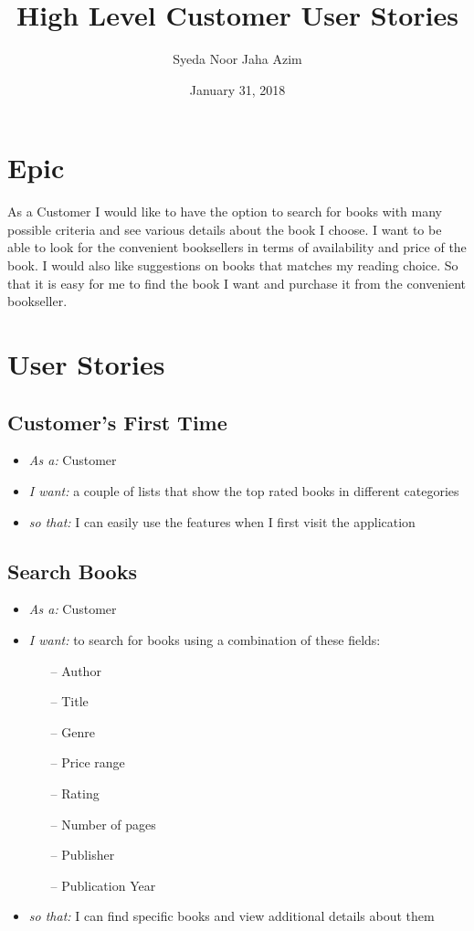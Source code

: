 \documentclass{article}
\title{High Level Customer User Stories}
\author{Syeda Noor Jaha Azim}
\date{January 31, 2018}
\begin{document}
\maketitle

\section{Epic }
As a Customer I would like to have the option to search for books with many possible criteria and see various details about the book I choose. I want to be able to look for the convenient booksellers in terms of availability and price of the book. I would also like suggestions on books that matches my reading choice. So that it is easy for me to find the book I want and purchase it from the convenient bookseller. 

\section{User Stories }

\subsection{Customer's First Time }
\begin{itemize}
\item \emph{As a:} Customer
\item \emph{I want:}  a couple of lists that show the top rated books in different categories
\item \emph{so that:}  I can easily use the features when I first visit the application
\end{itemize}

\subsection{Search Books}
\begin{itemize}
\item \emph{As a:} Customer
\item \emph{I want:} to search for books using a combination of these fields:
\begin{itemize}
    \item[--] Author
    \item[--] Title
    \item[--] Genre
    \item[--] Price range
    \item[--] Rating
    \item[--] Number of pages
    \item[--] Publisher
    \item[--] Publication Year
\end{itemize}
\item \emph{so that:} I can find specific books and view additional details about them
\end{itemize}
\end{document}
